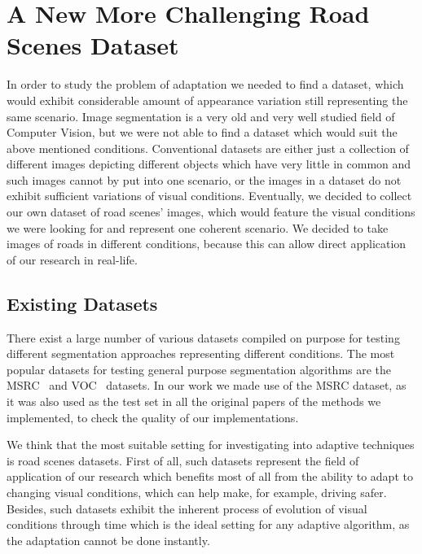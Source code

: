 \chapter{A New More Challenging Road Scenes Dataset}
\label{Chapter4}

In order to study the problem of adaptation we needed to find a dataset, which would exhibit considerable amount of appearance variation still
representing the same scenario. Image segmentation is a very old and very well studied field of Computer Vision, but we were not able to find
a dataset which would suit the above mentioned conditions. Conventional datasets are either just a collection of different images depicting
different objects which have very little in common and such images cannot by put into one scenario, or the images in a dataset do not 
exhibit sufficient variations of visual conditions. Eventually, we decided to collect our own dataset of road scenes' images, which would
feature the visual conditions we were looking for and represent one coherent scenario. We decided to take images of roads in different conditions,
because this can allow direct application of our research in real-life.

\section{Existing Datasets}
There exist a large number of various datasets compiled on purpose for testing different segmentation approaches representing
different conditions. The most popular datasets for testing general purpose segmentation algorithms are the MSRC~\cite{MSRC} and
VOC~\cite{VOC} datasets. In our work we made use of the MSRC dataset, as it was also used as the test set in all the original papers
of the methods we implemented, to check the quality of our implementations.

We think that the most suitable setting for investigating into adaptive techniques is road scenes datasets. First of all, such datasets 
represent the field of application of our research which benefits most of all from the ability to adapt to changing visual conditions, which can
help make, for example, driving safer. Besides, such datasets exhibit the inherent process of evolution of visual conditions through time
which is the ideal setting for any adaptive algorithm, as the adaptation cannot be done instantly.

